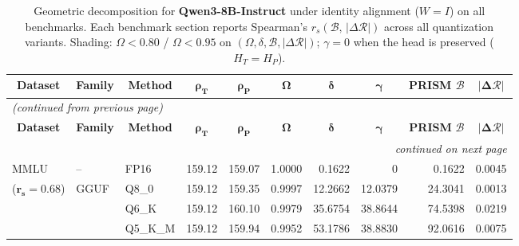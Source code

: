 \begingroup
\small
\setlength{\tabcolsep}{3pt}%
\renewcommand{\arraystretch}{1.05}
\setlength{\LTcapwidth}{\textwidth}
\begin{longtable}{ll l rrrrrrr}
\caption{Geometric decomposition for \textbf{Qwen3-8B-Instruct} under identity alignment ($W{=}I$) on all benchmarks. Each benchmark section reports Spearman's $r_s(\mathcal{B},\,|\Delta\mathcal{R}|)$ across all quantization variants. Shading: \colorbox{red!35}{$\Omega{<}0.80$} / \colorbox{red!18}{$\Omega{<}0.95$} on $(\Omega,\delta,\mathcal{B},|\Delta\mathcal{R}|)$; \colorbox{cyan!12}{$\gamma{=}0$} when the head is preserved ($H_T{=}H_P$).}\label{tab:qwen_instruct_decomposition_all_bound}\\
\toprule
\multicolumn{1}{c}{\textbf{Dataset}} & \multicolumn{1}{c}{\textbf{Family}} & \multicolumn{1}{c}{\textbf{Method}} & \multicolumn{1}{c}{$\boldsymbol{\rho_T}$} & \multicolumn{1}{c}{$\boldsymbol{\rho_P}$} & \multicolumn{1}{c}{$\boldsymbol{\Omega}$} & \multicolumn{1}{c}{$\boldsymbol{\delta}$} & \multicolumn{1}{c}{$\boldsymbol{\gamma}$} & \multicolumn{1}{c}{\textbf{PRISM} $\boldsymbol{\mathcal{B}}$} & \multicolumn{1}{c}{$\boldsymbol{|\Delta\mathcal{R}|}$} \\
\midrule
\endfirsthead
\multicolumn{10}{l}{\small\itshape (continued from previous page)}\\
\toprule
\multicolumn{1}{c}{\textbf{Dataset}} & \multicolumn{1}{c}{\textbf{Family}} & \multicolumn{1}{c}{\textbf{Method}} & \multicolumn{1}{c}{$\boldsymbol{\rho_T}$} & \multicolumn{1}{c}{$\boldsymbol{\rho_P}$} & \multicolumn{1}{c}{$\boldsymbol{\Omega}$} & \multicolumn{1}{c}{$\boldsymbol{\delta}$} & \multicolumn{1}{c}{$\boldsymbol{\gamma}$} & \multicolumn{1}{c}{\textbf{PRISM} $\boldsymbol{\mathcal{B}}$} & \multicolumn{1}{c}{$\boldsymbol{|\Delta\mathcal{R}|}$} \\
\midrule
\endhead
\midrule
\multicolumn{10}{r}{\small\itshape continued on next page}\\
\endfoot
\bottomrule
\endlastfoot
MMLU & -- & FP16 & 159.12 & 159.07 & 1.0000 & 0.1622 & \cellcolor{cyan!12} $0$ & 0.1622 & 0.0045 \\
{\small ($\mathbf{r_s{=}0.68}$)} & GGUF & Q8\_0 & 159.12 & 159.35 & 0.9997 & 12.2662 & 12.0379 & 24.3041 & 0.0013 \\
 &  & Q6\_K & 159.12 & 160.10 & 0.9979 & 35.6754 & 38.8644 & 74.5398 & 0.0219 \\
 &  & Q5\_K\_M & 159.12 & 159.94 & 0.9952 & 53.1786 & 38.8830 & 92.0616 & 0.0075 \\

\end{longtable}
